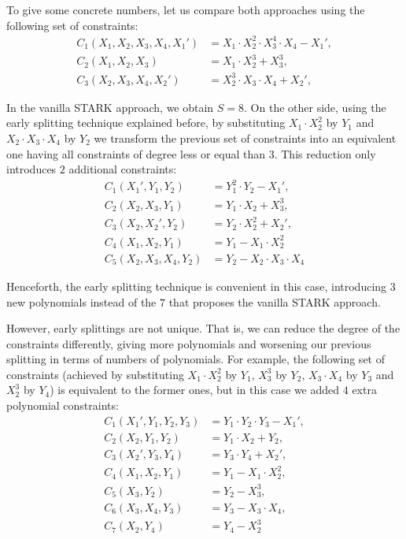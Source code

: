 \begin{example}
To give some concrete numbers, let us compare both approaches using the following set of constraints:
\begin{align*}
C_1(X_1, X_2, X_3, X_4, X_1') &= X_1 \cdot X_2^2 \cdot X_3^4 \cdot X_4 - X_1', \\[0.2cm]
C_2(X_1, X_2, X_3) &= X_1 \cdot X_2^3 + X_3^3 , \\[0.2cm]
C_3(X_2, X_3, X_4, X_2') &= X_2^3 \cdot X_3 \cdot X_4 + X_2',
\end{align*}

In the vanilla STARK approach, we obtain $S = 8$.
On the other side, using the early splitting technique explained before, by substituting $X_1 \cdot X_2^2$ by $Y_1$ and $X_2 \cdot X_3 \cdot X_4$ by $Y_2$ we transform the previous set of constraints into an equivalent one having all constraints of degree less or equal than $3$. This reduction only introduces $2$ additional constraints: 
\begin{align*}
C_1(X_1', Y_1, Y_2) &= Y_1^2 \cdot Y_2 - X_1', \\[0.2cm]
C_2(X_2, X_3, Y_1) &= Y_1 \cdot X_2 + X_3^3, \\[0.2cm]
C_3(X_2, X_2', Y_2) &= Y_2 \cdot X_2^2 + X_2', 	\\[0.2cm]
C_4(X_1, X_2, Y_1) &= 	Y_1 - X_1 \cdot X_2^2\\[0.2cm]
C_5(X_2, X_3, X_4, Y_2) &= Y_2 - X_2 \cdot X_3 \cdot X_4
\end{align*}

Henceforth, the early splitting technique is convenient in this case, introducing $3$ new polynomials instead of the $7$ that proposes the vanilla STARK approach. 

However, early splittings are not unique. That is, we can reduce the degree of the constraints differently, giving more polynomials and worsening our previous splitting in terms of numbers of polynomials. For example, the following set of constraints (achieved by substituting $X_1 \cdot X_2^2$ by $Y_1$, $X_3^3$ by $Y_2$, $X_3 \cdot X_4$ by $Y_3$ and $X_2^3$ by $Y_4$) is equivalent to the former ones, but in this case we added $4$ extra polynomial constraints:
\begin{align*}
C_1(X_1', Y_1, Y_2, Y_3) &= Y_1 \cdot Y_2 \cdot Y_3 - X_1', \\[0.2cm]
C_2(X_2, Y_1, Y_2) &= Y_1 \cdot X_2 + Y_2, \\[0.2cm]
C_3(X_2', Y_3, Y_4) &= Y_3 \cdot Y_4 + X_2', \\[0.2cm]
C_4(X_1, X_2, Y_1) &= Y_1 - X_1 \cdot X_2^2, \\[0.2cm]
C_5(X_3, Y_2) &= Y_2 - X_3^3, \\[0.2cm]
C_6(X_3, X_4, Y_3) &= Y_3 - X_3 \cdot X_4, \\[0.2cm]
C_7(X_2,Y_4) &= Y_4 - X_2^3
\end{align*}


\end{example}
